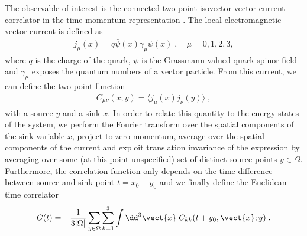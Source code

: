 The observable of interest is the connected two-point isovector vector current correlator in the time-momentum representation \cite{Bernecker:2011}.
The local electromagnetic vector current is defined as 
\begin{align}
j_{\mu}(x) = q \bar{\psi}(x) \gamma_{\mu} \psi(x) \;,
\quad
\mu=0,1,2,3,
\end{align}
where $q$ is the charge of the quark, $\psi$ is the Grassmann-valued quark spinor field and $\gamma_{\mu}$ exposes the quantum numbers of a vector particle. From this current, we can define the two-point function
\begin{align} \label{eq:C_corr_xy}
C_{\mu \nu}(x;y) = \langle j_{\mu}(x) j_{\nu}(y) \rangle \;,
\end{align}
with a source $y$ and a sink $x$.
In order to relate this quantity to the energy states of the system, we perform the Fourier transform over the spatial components of the sink variable $x$, project to zero momentum, average over the spatial components of the current and exploit translation invariance of the expression by averaging over some (at this point unspecified) set of distinct source points $y \in \Omega$.
Furthermore, the correlation function only depends on the time difference between source and sink point $t = x_0 - y_0$ and we finally define the Euclidean time correlator
\begin{align} \label{eq:coor1}
G(t) = - \frac{1}{3 \lvert \Omega \rvert} \sum_{y \in \Omega} \sum_{k=1}^{3} \int \dd^3 \vect{x} \; C_{kk}(t+y_0, \vect{x}; y) \;.
\end{align}


